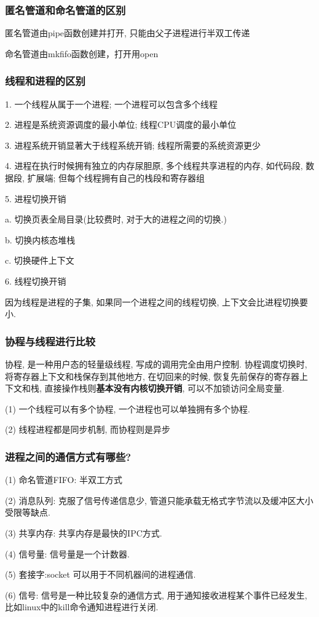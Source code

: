 \documentclass[UTF8]{ctexart}
\begin{document}
\subsubsection{匿名管道和命名管道的区别}
匿名管道由pipe函数创建并打开, 只能由父子进程进行半双工传递

命名管道由mkfifo函数创建，打开用open


\subsubsection{线程和进程的区别}
1. 一个线程从属于一个进程; 一个进程可以包含多个线程

2. 进程是系统资源调度的最小单位; 线程CPU调度的最小单位

3. 进程系统开销显著大于线程系统开销; 线程所需要的系统资源更少

4. 进程在执行时候拥有独立的内存尿胆原, 多个线程共享进程的内存, 如代码段, 数据段, 扩展端; 但每个线程拥有自己的栈段和寄存器组

5. 进程切换开销

a. 切换页表全局目录(比较费时, 对于大的进程之间的切换.)

b. 切换内核态堆栈

c. 切换硬件上下文

6. 线程切换开销

因为线程是进程的子集, 如果同一个进程之间的线程切换, 上下文会比进程切换要小.
\subsubsection{协程与线程进行比较}
协程, 是一种用户态的轻量级线程, 写成的调用完全由用户控制. 协程调度切换时, 将寄存器上下文和栈保存到其他地方, 在切回来的时候, 恢复先前保存的寄存器上下文和栈, 直接操作栈则\textbf{基本没有内核切换开销}, 可以不加锁访问全局变量. \par
(1) 一个线程可以有多个协程, 一个进程也可以单独拥有多个协程. \par
(2) 线程进程都是同步机制, 而协程则是异步 \par
\subsubsection{进程之间的通信方式有哪些?}
(1) 命名管道FIFO: 半双工方式 \par
(2) 消息队列: 克服了信号传递信息少, 管道只能承载无格式字节流以及缓冲区大小受限等缺点. \par
(3) 共享内存: 共享内存是最快的IPC方式. \par
(4) 信号量: 信号量是一个计数器. \par
(5) 套接字:socket 可以用于不同机器间的进程通信. \par
(6) 信号: 信号是一种比较复杂的通信方式, 用于通知接收进程某个事件已经发生, 比如linux中的kill命令通知进程进行关闭. \par
\end{document}
